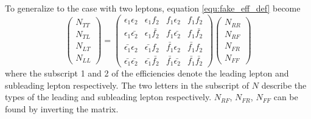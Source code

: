 To generalize to the case with two leptons, equation \ref{equ:fake_eff_def} become
\begin{equation}
\left( \begin{array}{c}
N_{TT} \\
N_{TL} \\
N_{LT} \\
N_{LL}
\end{array} \right)
=
\left( \begin{array}{cccc}
\epsilon_1 \epsilon_2 & \epsilon_1 f_2 & f_1 \epsilon_2 & f_1 f_2 \\
\epsilon_1 \bar{\epsilon_2} & \epsilon_1 \bar{f_2} & f_1 \bar{\epsilon_2} & f_1 \bar{f_2} \\
\bar{\epsilon_1} \epsilon_2 & \bar{\epsilon_1} f_2 & \bar{f_1} \epsilon_2 & \bar{f_1} f_2 \\
\bar{\epsilon_1} \bar{\epsilon_2} & \bar{\epsilon_1} \bar{f_2} & \bar{f_1} \bar{\epsilon_2} & \bar{f_1} \bar{f_2}
\end{array} \right)
\left( \begin{array}{c}
N_{RR} \\
N_{RF} \\
N_{FR} \\
N_{FF}
\end{array} \right)
\end{equation}
where the subscript 1 and 2 of the efficiencies denote the leading lepton and subleading lepton respectively.
The two letters in the subscript of $N$ describe the types of the leading and subleading lepton respectively.
$N_{RF}$, $N_{FR}$, $N_{FF}$ can be found by inverting the matrix.
